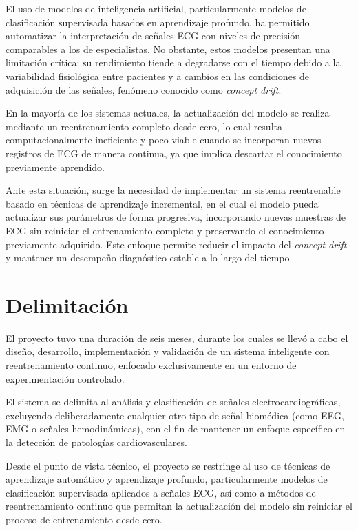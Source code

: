 El uso de modelos de inteligencia artificial, particularmente modelos de clasificación supervisada basados en aprendizaje profundo, ha permitido automatizar la interpretación de señales ECG con niveles de precisión comparables a los de especialistas. No obstante, estos modelos presentan una limitación crítica: su rendimiento tiende a degradarse con el tiempo debido a la variabilidad fisiológica entre pacientes y a cambios en las condiciones de adquisición de las señales, fenómeno conocido como \textit{concept drift}.

En la mayoría de los sistemas actuales, la actualización del modelo se realiza mediante un reentrenamiento completo desde cero, lo cual resulta computacionalmente ineficiente y poco viable cuando se incorporan nuevos registros de ECG de manera continua, ya que implica descartar el conocimiento previamente aprendido.

Ante esta situación, surge la necesidad de implementar un sistema reentrenable basado en técnicas de aprendizaje incremental, en el cual el modelo pueda actualizar sus parámetros de forma progresiva, incorporando nuevas muestras de ECG sin reiniciar el entrenamiento completo y preservando el conocimiento previamente adquirido. Este enfoque permite reducir el impacto del \textit{concept drift} y mantener un desempeño diagnóstico estable a lo largo del tiempo.

\section{Delimitación}

El proyecto tuvo una duración de seis meses, durante los cuales se llevó a cabo el diseño, desarrollo, implementación y validación de un sistema inteligente con reentrenamiento continuo, enfocado exclusivamente en un entorno de experimentación controlado.

El sistema se delimita al análisis y clasificación de señales electrocardiográficas, excluyendo deliberadamente cualquier otro tipo de señal biomédica (como EEG, EMG o señales hemodinámicas), con el fin de mantener un enfoque específico en la detección de patologías cardiovasculares.

Desde el punto de vista técnico, el proyecto se restringe al uso de técnicas de aprendizaje automático y aprendizaje profundo, particularmente modelos de clasificación supervisada aplicados a señales ECG, así como a métodos de reentrenamiento continuo que permitan la actualización del modelo sin reiniciar el proceso de entrenamiento desde cero.


